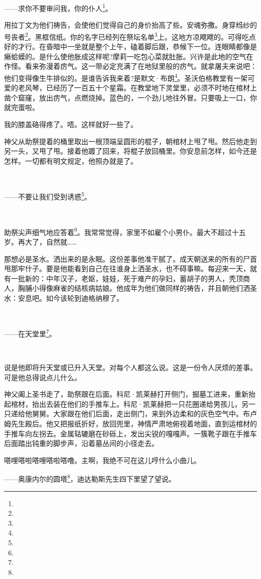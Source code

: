 \par ——求你不要审问我，你的仆人\footnote{}。
\par 用拉丁文为他们祷告，会使他们觉得自己的身价抬高了些。安魂弥撒。身穿绉纱的号丧者\footnote{}。黑框信纸。你的名字已经列在祭坛名单\footnote{}上。这地方凉飕飕的。可得吃点好的才行。在昏暗中一坐就是整个上午，磕着脚后跟，恭候下一位。连眼睛都像是癞蛤蟆的。是什么使他胀成这样呢?摩莉一吃包心菜就肚胀。兴许是此地的空气在作怪。看来弥漫着疠气。这一带必定充满了在地狱里般的疠气。就拿屠夫来说吧：他们变得像生牛排似的。是谁告诉我来着?是默文·布朗\footnote{}。圣沃伯格教堂有一架可爱的老风琴，已经历了一百五十个星霜。在教堂地下灵堂里，必须不时地在棺材上凿个窟窿，放出疠气，点燃烧掉。蓝色的，一个劲儿地往外冒。只要吸上一口，你就完蛋啦。
\par 我的膝盖硌得疼了。唔。这样就好一些了。
\par 神父从助祭提着的桶里取出一根顶端呈圆形的棍子，朝棺材上甩了甩。然后他走到另一头，又甩了甩。接着他踱了回来，将棍子放回桶里。你安息前怎样，如今还是怎样。一切都有明文规定，他照办就是了。
\par  
\par ——不要让我们受到诱惑\footnote{}。
\par  
\par 助祭尖声细气地应答着\footnote{}。我常常觉得，家里不如雇个小男仆。最大不超过十五岁。再大了，自然就……
\par 那想必是圣水。洒出来的是永眠。这份差事他准干腻了。成天朝送来的所有的尸首甩那牢什子。要是他能看到自己在往谁身上洒圣水，也不碍事嘛。每迎来一天，就有一批新的：中年汉子，老妪，娃娃，死于难产的孕妇，蓄胡子的男人，秃顶商人，胸脯小得像麻雀的结核病姑娘。他成年为他们做同样的祷告，并且朝他们洒圣水：安息吧。如今该轮到迪格纳穆了。
\par  
\par ——在天堂里\footnote{}。
\par  
\par 说是他即将升天堂或已升入天堂。对每个人都这么说。这是一份令人厌烦的差事。可是他总得说点儿什么。
\par 神父阖上圣书走了，助祭跟在后面。科尼·凯莱赫打开侧门，掘墓工进来，重新抬起棺材，抬出去装在他们的手推车上。科尼·凯莱赫把一只花圈递给男孩儿，另一只递给他舅舅。大家跟在他们后面，走出侧门，来到外边柔和的灰色空气中。布卢姆先生殿后。他又把报纸折好，放回兜里，神情严肃地俯视着地面，直到运棺材的手推车向左拐去。金属轱辘磨在砂砾上，发出尖锐的嘎嘎声。一簇靴子跟在手推车后面踏出钝重的脚步声，沿着墓丛间的小径走去。
\par 嗒哩嗒啦嗒哩嗒啦嗒噜。主啊，我绝不可在这儿哼什么小曲儿。
\par ——奥康内尔的圆塔\footnote{}，迪达勒斯先生四下里望了望说。
